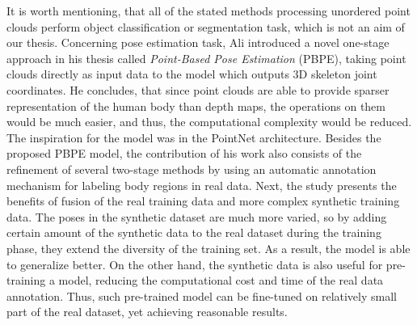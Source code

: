 \noindent It is worth mentioning, that all of the stated methods processing unordered point clouds perform object classification or segmentation task, which is not an aim of our thesis. Concerning pose estimation task, Ali \cite{Ali19} introduced a novel one-stage approach in his thesis called \textit{Point-Based Pose Estimation} (PBPE), taking point clouds directly as input data to the model which outputs 3D skeleton joint coordinates. He concludes, that since point clouds are able to provide sparser representation of the human body than depth maps, the operations on them would be much easier, and thus, the computational complexity would be reduced. The inspiration for the model was in the PointNet architecture. Besides the proposed PBPE model, the contribution of his work also consists of the refinement of several two-stage methods by using an automatic annotation mechanism for labeling body regions in real data. Next, the study presents the benefits of fusion of the real training data and more complex synthetic training data. The poses in the synthetic dataset are much more varied, so by adding certain amount of the synthetic data to the real dataset during the training phase, they extend the diversity of the training set. As a result, the model is able to generalize better. On the other hand, the synthetic data is also useful for pre-training a model, reducing the computational cost and time of the real data annotation. Thus, such pre-trained model can be fine-tuned on relatively small part of the real dataset, yet achieving reasonable results. \par








